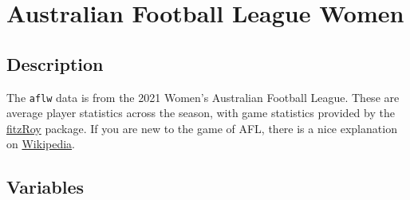 \documentclass[
  letterpaper,
]{book}
\begin{document}
\hypertarget{australian-football-league-women}{%
\section{Australian Football League
Women}\label{australian-football-league-women}}

\hypertarget{description}{%
\subsection*{Description}\label{description}}

The \texttt{aflw} data is from the 2021 Women's Australian Football
League. These are average player statistics across the season, with game
statistics provided by the
\href{https://jimmyday12.github.io/fitzRoy/}{fitzRoy} package. If you
are new to the game of AFL, there is a nice explanation on
\href{https://en.wikipedia.org/wiki/Women\%27s_Australian_rules_football}{Wikipedia}.

\hypertarget{variables}{%
\subsection*{Variables}\label{variables}}
\end{document}
